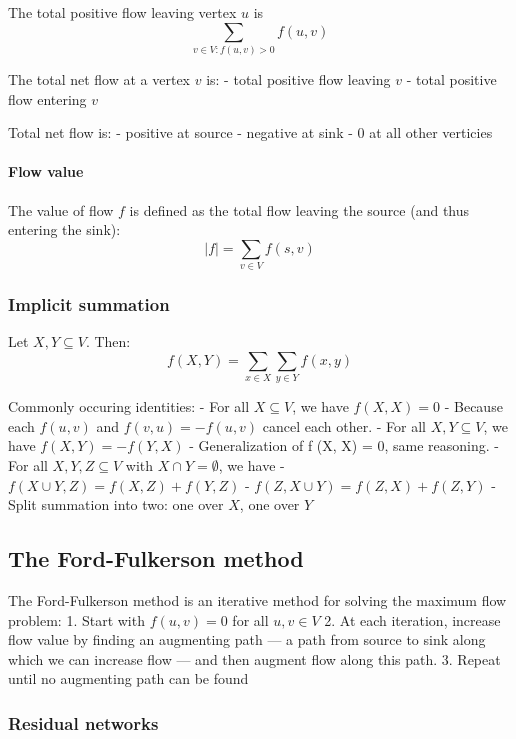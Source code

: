 \documentclass[11pt]{article}
\begin{document}
The total positive flow leaving vertex \(u\) is
\[\sum_{v \in V: f(u, v)>0} f(u, v)\]

The total net flow at a vertex \(v\) is: - total positive flow leaving
\(v\) - total positive flow entering \(v\)

Total net flow is: - positive at source - negative at sink - 0 at all
other verticies

\paragraph{Flow value}\label{flow-value}

The value of flow \(f\) is defined as the total flow leaving the source
(and thus entering the sink): \[|f| = \sum_{v\in V} f(s,v)\]

    \subsubsection{Implicit summation}\label{implicit-summation}

Let \(X, Y \subseteq V\). Then:
\[f(X,Y) = \sum_{x \in X} \sum_{y \in Y} f(x,y)\]

Commonly occuring identities: - For all \(X \subseteq V\), we have
\(f(X, X) = 0\) - Because each \(f(u, v)\) and \(f(v, u) = -f(u, v)\)
cancel each other. - For all \(X, Y \subseteq V\), we have
\(f(X, Y) = -f(Y, X)\) - Generalization of f (X, X) = 0, same reasoning.
- For all \(X, Y , Z \subseteq V\) with \(X \cap Y = \emptyset\), we
have - \(f(X \cup Y, Z) = f(X, Z) + f(Y , Z)\) -
\(f(Z, X \cup Y) = f(Z, X) + f(Z, Y)\) - Split summation into two: one
over \(X\), one over \(Y\)

    \subsection{The Ford-Fulkerson method}\label{the-ford-fulkerson-method}

The Ford-Fulkerson method is an iterative method for solving the maximum
flow problem: 1. Start with \(f(u, v) = 0\) for all \(u, v \in V\) 2. At
each iteration, increase flow value by finding an augmenting path --- a
path from source to sink along which we can increase flow --- and then
augment flow along this path. 3. Repeat until no augmenting path can be
found

    \subsubsection{Residual networks}\label{residual-networks}
\end{document}

